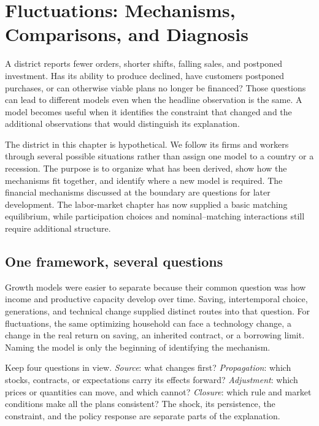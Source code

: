 \section{Fluctuations: Mechanisms, Comparisons, and Diagnosis}
\label{sec:fluctuations-synthesis}

A district reports fewer orders, shorter shifts, falling sales, and postponed
investment. Has its ability to produce declined, have customers postponed
purchases, or can otherwise viable plans no longer be financed? Those questions
can lead to different models even when the headline observation is the same.
A model becomes useful when it identifies the constraint that changed and the
additional observations that would distinguish its explanation.

The district in this chapter is hypothetical. We follow its firms and workers
through several possible situations rather than assign one model to a country
or a recession. The purpose is to organize what has been derived, show how the
mechanisms fit together, and identify where a new model is required. The
financial mechanisms discussed at the boundary are questions for later
development. The labor-market chapter has now supplied a basic matching
equilibrium, while participation choices and nominal--matching interactions
still require additional structure.

\subsection{One framework, several questions}

Growth models were easier to separate because their common question was how
income and productive capacity develop over time. Saving, intertemporal choice,
generations, and technical change supplied distinct routes into that question.
For fluctuations, the same optimizing household can face a technology change,
a change in the real return on saving, an inherited contract, or a borrowing
limit. Naming the model is only the beginning of identifying the mechanism.

Keep four questions in view. \emph{Source}: what changes first? \emph{Propagation}:
which stocks, contracts, or expectations carry its effects forward?
\emph{Adjustment}: which prices or quantities can move, and which cannot?
\emph{Closure}: which rule and market conditions make all the plans consistent?
The shock, its persistence, the constraint, and the policy response are separate
parts of the explanation.


